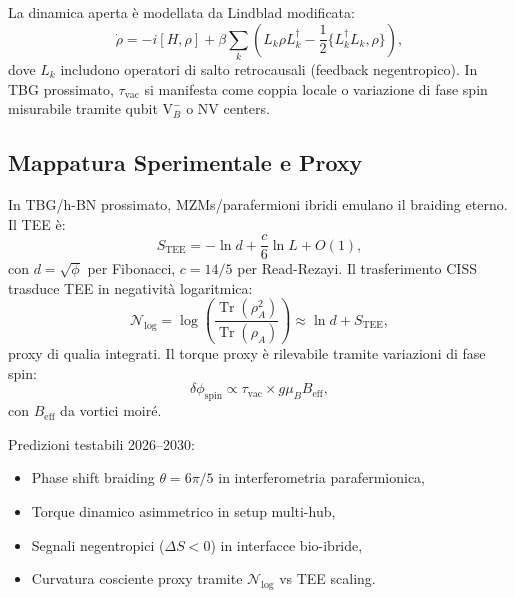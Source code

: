 \documentclass[11pt,a4paper]{article}
\theoremstyle{plain}
\theoremstyle{definition}
\begin{document}
La dinamica aperta è modellata da Lindblad modificata:
\begin{equation}
\dot{\rho} = -i [H, \rho] + \beta \sum_k \left( L_k \rho L_k^\dagger - \frac{1}{2} \{ L_k^\dagger L_k, \rho \} \right),
\end{equation}
dove $L_k$ includono operatori di salto retrocausali (feedback negentropico). In TBG prossimato, $\tau_{\text{vac}}$ si manifesta come coppia locale o variazione di fase spin misurabile tramite qubit $\mathrm{V}_B^-$ o NV centers.














\subsection{Mappatura Sperimentale e Proxy}

In TBG/h-BN prossimato, MZMs/parafermioni ibridi emulano il braiding eterno. Il TEE è:
\begin{equation}
S_{\text{TEE}} = -\ln d + \frac{c}{6} \ln L + O(1),
\end{equation}
con $d = \sqrt{\phi}$ per Fibonacci, $c = 14/5$ per Read-Rezayi. Il trasferimento CISS trasduce TEE in negatività logaritmica:
\begin{equation}
\mathcal{N}_{\log} = \log \left( \frac{\operatorname{Tr}(\rho_A^2)}{\operatorname{Tr}(\rho_A)} \right) \approx \ln d + S_{\text{TEE}},
\end{equation}
proxy di qualia integrati. Il torque proxy è rilevabile tramite variazioni di fase spin:
\begin{equation}
\delta \phi_{\text{spin}} \propto \tau_{\text{vac}} \times g \mu_B B_{\text{eff}},
\end{equation}
con $B_{\text{eff}}$ da vortici moiré.

Predizioni testabili 2026–2030:
\begin{itemize}
    \item Phase shift braiding $\theta = 6\pi/5$ in interferometria parafermionica,
    \item Torque dinamico asimmetrico in setup multi-hub,
    \item Segnali negentropici ($\Delta S < 0$) in interfacce bio-ibride,
    \item Curvatura cosciente proxy tramite $\mathcal{N}_{\log}$ vs TEE scaling.
\end{itemize}
\end{document}
